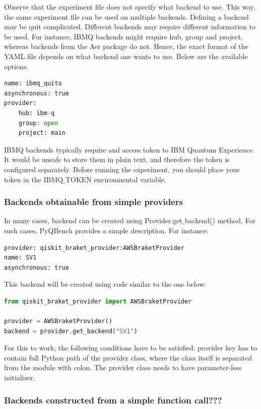 \documentclass[preprint,12pt, a4paper, dvipsnames]{elsarticle}
\newcommand{\1}{{\rm 1\hspace{-0.9mm}l}}
\begin{document}
Observe that the experiment file does not specify what backend to use. This way, the same experiment file can be used on multiple backends.
Defining a backend may be quit complicated. Different backends may require different information to be used. For instance, IBMQ backends might require hub, group and project, whereas backends from the Aer package do not. Hence, the exact format of the YAML file depends on what backend one wants to use. Below are the available options.


\begin{lstlisting}[language=Python, caption=IBMQ backends]
name: ibmq_quito
asynchronous: true
provider:
	hub: ibm-q
	group: open
	project: main
\end{lstlisting}


IBMQ backends typically require and access token to IBM Quantum Experience. It would be unsafe to store them in plain text, and therefore the token is configured separately. Before running the experiment, you should place your token in the IBMQ$\_$TOKEN environmental variable.

\subsubsection{Backends obtainable from simple providers}
In many cases, backend can be created using Provider.get$\_$backend() method. For such cases, PyQBench provides a simple description. For instance:




\begin{lstlisting}[language=Python]
provider: qiskit_braket_provider:AWSBraketProvider
name: SV1
asynchronous: true
\end{lstlisting}

This backend will be created using code similar to the one below:

\begin{lstlisting}[language=Python]
from qiskit_braket_provider import AWSBraketProvider

provider = AWSBraketProvider()
backend = provider.get_backend("SV1")
\end{lstlisting}


For this to work, the following conditions have to be satisfied:
provider key has to contain full Python path of the provider class, where the class itself is separated from the module with colon. The provider class needs to have parameter-less initializer.

\subsubsection{Backends constructed from a simple function call???}
\end{document}
